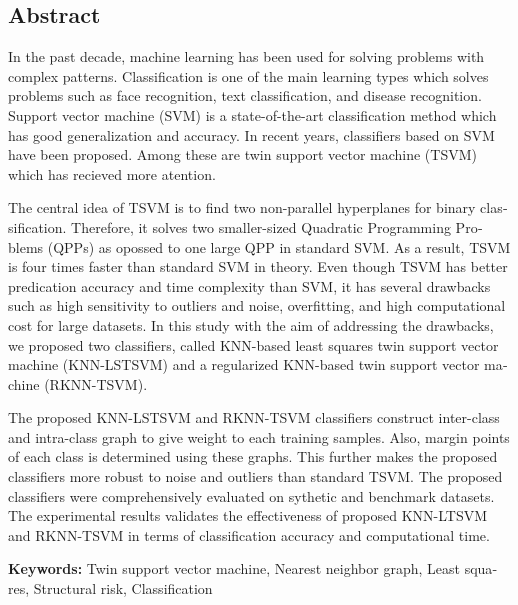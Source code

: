 \pagestyle{plain}


\begin{latin}
	
	\section*{Abstract}
	\noindent In the past decade, machine learning has been used for solving problems with complex patterns. Classification is one of the main learning types which solves problems such as face recognition, text classification, and disease recognition. Support vector machine (SVM) is a state-of-the-art classification method which has good generalization and accuracy. In recent years, classifiers based on SVM have been proposed. Among these are twin support vector machine (TSVM) which has recieved more atention.
	
	The central idea of TSVM is to find two non-parallel hyperplanes for binary classification. Therefore, it solves two smaller-sized Quadratic Programming Problems (QPPs) as opossed to one large QPP in standard SVM. As a result, TSVM is four times faster than standard SVM in theory. Even though TSVM has better predication accuracy and time complexity than SVM, it has several drawbacks such as high sensitivity to outliers and noise, overfitting, and high computational cost for large datasets. In this study with the aim of addressing the drawbacks, we proposed two classifiers, called KNN-based least squares twin support vector machine (KNN-LSTSVM) and a regularized KNN-based twin support vector machine (RKNN-TSVM).
	
	The proposed KNN-LSTSVM and RKNN-TSVM classifiers construct inter-class and intra-class graph to give weight to each training samples. Also, margin points of each class is determined using these graphs. This further makes the proposed classifiers more robust to noise and outliers than standard TSVM. The proposed classifiers were comprehensively evaluated on sythetic and benchmark datasets. The experimental results validates the effectiveness of proposed KNN-LTSVM and RKNN-TSVM in terms of classification accuracy and computational time.
	
	
	\vspace{2cm}
	\noindent \textbf{Keywords:}
	Twin support vector machine, Nearest neighbor graph, Least squares, Structural risk, Classification 
	
\end{latin}